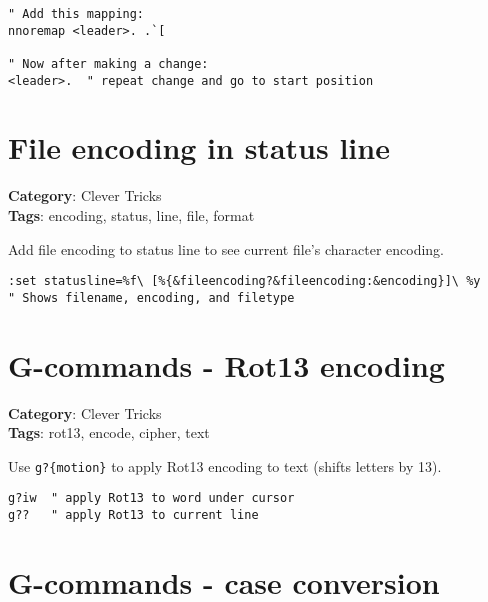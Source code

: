 {{{\begin{Exa*}{}
\begin{Verbatim}[fontsize=\footnotesize, breaklines, breakanywhere]
" Add this mapping:
nnoremap <leader>. .`[

" Now after making a change:
<leader>.  " repeat change and go to start position
\end{Verbatim}
\end{Exa*}

\section{File encoding in status line}

\textbf{Category}: Clever Tricks\\ \textbf{Tags}: encoding, status, line, file, format
\vspace{0.5cm}

Add file encoding to status line to see current file's character encoding.

\begin{Exa*}{}
\begin{Verbatim}[fontsize=\footnotesize, breaklines, breakanywhere]
:set statusline=%f\ [%{&fileencoding?&fileencoding:&encoding}]\ %y
" Shows filename, encoding, and filetype
\end{Verbatim}
\end{Exa*}

\section{G-commands - Rot13 encoding}

\textbf{Category}: Clever Tricks\\ \textbf{Tags}: rot13, encode, cipher, text
\vspace{0.5cm}

Use {\footnotesize \Verb§g?{motion}§} to apply Rot13 encoding to text (shifts letters by 13).

\begin{Exa*}{}
\begin{Verbatim}[fontsize=\footnotesize, breaklines, breakanywhere]
g?iw  " apply Rot13 to word under cursor
g??   " apply Rot13 to current line
\end{Verbatim}
\end{Exa*}

\section{G-commands - case conversion}

}}}
